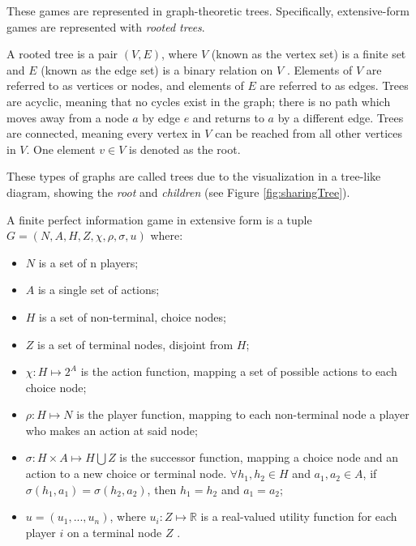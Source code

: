 These games are represented in graph-theoretic trees. Specifically, extensive-form games are represented with \textit{rooted trees}.
\begin{define}
  A rooted tree is a pair $(V, E)$, where $V$ (known as the vertex set) is a finite set and $E$ (known as the edge set) is a binary relation on $V$ \cite{corm09}. Elements of $V$ are referred to as vertices or nodes, and elements of $E$ are referred to as edges. Trees are acyclic, meaning that no cycles exist in the graph; there is no path which moves away from a node $a$ by edge $e$ and returns to $a$ by a different edge. Trees are connected, meaning every vertex in $V$ can be reached from all other vertices in $V$. One element $v\in V$ is denoted as the root.
\end{define}

These types of graphs are called trees due to the visualization in a tree-like diagram, showing the \textit{root} and \textit{children} (see Figure \ref{fig:sharingTree}).

\begin{define}
  A finite perfect information game in extensive form is a tuple $G = (N, A, H, Z, \chi, \rho, \sigma, u)$ where:
  \begin{itemize}
  \item $N$ is a set of n players;
  \item $A$ is a single set of actions;
  \item $H$ is a set of non-terminal, choice nodes;
  \item $Z$ is a set of terminal nodes, disjoint from $H$;
  \item $\chi: H\mapsto 2^A$ is the action function, mapping a set of possible actions to each choice node;
  \item $\rho: H\mapsto N$ is the player function, mapping to each non-terminal node a player who makes an action at said node;
  \item $\sigma: H\times A\mapsto H\bigcup Z$ is the successor function, mapping a choice node and an action to a new choice or terminal node. $\forall h_1, h_2\in H$ and $a_1, a_2\in A$, if $\sigma(h_1, a_1)=\sigma(h_2, a_2)$, then $h_1=h_2$ and $a_1=a_2$;
  \item $u=(u_1,...,u_n)$, where $u_i:Z\mapsto \mathbb{R}$ is a real-valued utility function for each player $i$ on a terminal node $Z$ \cite{shoh09}.
  \end{itemize}
\end{define}

